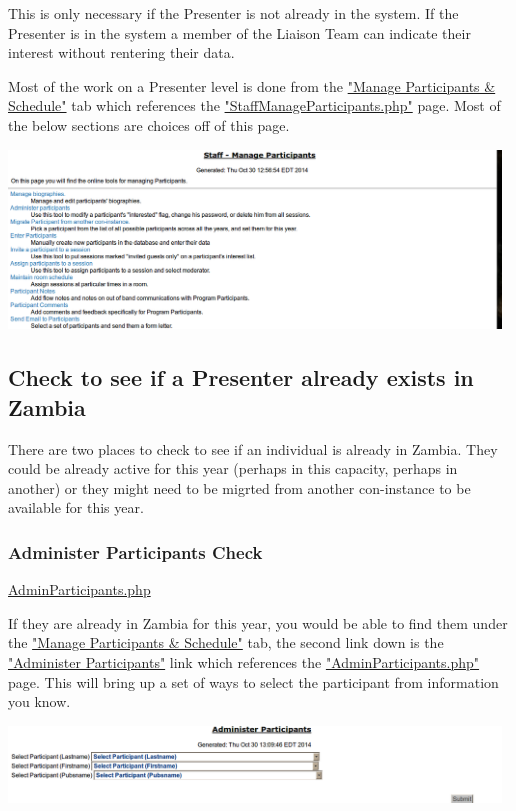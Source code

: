 \documentclass[captions=tablesignature]{scrartcl}
\begin{document}
This is only necessary if the Presenter is not already in the
system.  If the Presenter is in the system a member of the Liaison
Team can indicate their interest without rentering their data.

Most of the work on a Presenter level is done from the 
\href{../webpages/StaffManageParticipants.php}{"Manage Participants \& Schedule"} tab which references the
\href{../webpages/StaffManageParticipants.php}{"StaffManageParticipants.php"} page.  Most of the below sections are
choices off of this page.

\includegraphics[width=0.98\textwidth]{./Images/Manage_Participants.png}

\subsection{Check to see if a Presenter already exists in Zambia}
\label{sec-2-1}

There are two places to check to see if an individual is already in
Zambia.  They could be already active for this year (perhaps in
this capacity, perhaps in another) or they might need to be migrted
from another con-instance to be available for this year.

\subsubsection{Administer Participants Check}
\label{sec-2-1-1}
\href{../webpages/AdminParticipants.php}{AdminParticipants.php}

If they are already in Zambia for this year, you would be able to
find them under the \href{../webpages/StaffManageParticipants.php}{"Manage Participants \& Schedule"} tab, the
second link down is the \href{../webpages/AdminParticipants.php}{"Administer Participants"} link which
references the \href{../webpages/AdminParticipants.php}{"AdminParticipants.php"} page.  This will bring up a
set of ways to select the participant from information you know.

\includegraphics[width=0.98\textwidth]{./Images/Administer_Participants_Header.png}
\end{document}

